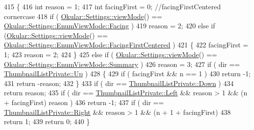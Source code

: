 \begin{DoxyCode}
415 \{
416     \textcolor{keywordtype}{int} reason = 1;
417     \textcolor{keywordtype}{int} facingFirst = 0; \textcolor{comment}{//facingFirstCentered cornercase}
418     \textcolor{keywordflow}{if} ( \hyperlink{classOkular_1_1Settings_a54872ccea98a1749bdccc6552c1aaa84}{Okular::Settings::viewMode}() == 
      \hyperlink{classOkular_1_1Settings_1_1EnumViewMode_a33bc89b0f0c02bd5539bad916569a665ad6ce5fe491499be5fc070b0364e24287}{Okular::Settings::EnumViewMode::Facing} )
419         reason = 2;
420     \textcolor{keywordflow}{else} \textcolor{keywordflow}{if} (\hyperlink{classOkular_1_1Settings_a54872ccea98a1749bdccc6552c1aaa84}{Okular::Settings::viewMode}() == 
      \hyperlink{classOkular_1_1Settings_1_1EnumViewMode_a33bc89b0f0c02bd5539bad916569a665a9c6afefcdc8d9a813c22e4492a8eecfb}{Okular::Settings::EnumViewMode::FacingFirstCentered} )
421     \{
422         facingFirst = 1;
423         reason = 2;
424     \}
425     \textcolor{keywordflow}{else} \textcolor{keywordflow}{if} ( \hyperlink{classOkular_1_1Settings_a54872ccea98a1749bdccc6552c1aaa84}{Okular::Settings::viewMode}() == 
      \hyperlink{classOkular_1_1Settings_1_1EnumViewMode_a33bc89b0f0c02bd5539bad916569a665a6551656e4f96799c3792390290c061fb}{Okular::Settings::EnumViewMode::Summary} )
426         reason = 3;
427     \textcolor{keywordflow}{if} ( dir == \hyperlink{classThumbnailListPrivate_a28316c5b42c24bc9ab372f8e978406a4ab0ee1d26fb7fc925de8fe7f285fef670}{ThumbnailListPrivate::Up} )
428     \{
429         \textcolor{keywordflow}{if} ( facingFirst && n == 1 )
430             \textcolor{keywordflow}{return} -1;
431         \textcolor{keywordflow}{return} -reason;
432     \}
433     \textcolor{keywordflow}{if} ( dir == \hyperlink{classThumbnailListPrivate_a28316c5b42c24bc9ab372f8e978406a4a3df30b06f7c84a030ac776720e030daa}{ThumbnailListPrivate::Down} )
434         \textcolor{keywordflow}{return} reason;
435     \textcolor{keywordflow}{if} ( dir == \hyperlink{classThumbnailListPrivate_a28316c5b42c24bc9ab372f8e978406a4a912a006610f67bc7eddda7af25b426a4}{ThumbnailListPrivate::Left} && reason > 1 && (n + facingFirst)  %
      reason )
436         \textcolor{keywordflow}{return} -1;
437     \textcolor{keywordflow}{if} ( dir == \hyperlink{classThumbnailListPrivate_a28316c5b42c24bc9ab372f8e978406a4a906421fa5f8cd56bf16aba2657726492}{ThumbnailListPrivate::Right} && reason > 1 && (n + 1 + 
      facingFirst) %
438         \textcolor{keywordflow}{return} 1;
439     \textcolor{keywordflow}{return} 0;
440 \}
\end{DoxyCode}
